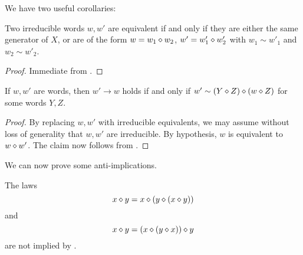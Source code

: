 We have two useful corollaries:

\begin{corollary}\label{unique factorization}\leanok{}  Two irreducible words $w, w'$ are equivalent if and only if they are either the same generator of $X$, or are of the form $w = w_1 \diamond w_2$, $w' = w'_1 \diamond w'_2$ with $w_1 \sim w'_1$ and $w_2 \sim w'_2$.
\end{corollary}

\begin{proof}\leanok  Immediate from .
\end{proof}

\begin{corollary}\label{graph-desc}  If $w,w'$ are words, then $w' \to w$ holds if and only if $w' \sim (Y \diamond Z) \diamond (w \diamond Z)$ for some words $Y,Z$.
\end{corollary}

\begin{proof}  By replacing $w,w'$ with irreducible equivalents, we may assume without loss of generality that $w,w'$ are irreducible.  By hypothesis, $w$ is equivalent to $w \diamond w'$.  The claim now follows from .
\end{proof}



We can now prove some anti-implications.

\begin{theorem}\label{854-anti}\leanok{}  The laws
\begin{equation}\label{3316}
  x \diamond y = x \diamond (y \diamond (x \diamond y))
\end{equation}
and
\begin{equation}\label{3925}
  x \diamond y = (x \diamond (y \diamond x)) \diamond y
\end{equation}
are not implied by .
\end{theorem}

